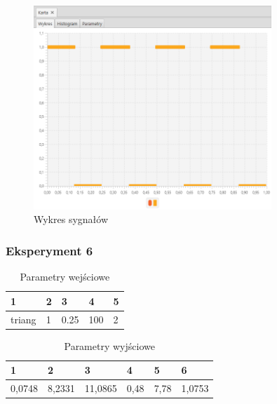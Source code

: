 \documentclass[12pt]{article}
\begin{document}
{{{                \begin{figure}[H]
                    \centering
                    \includegraphics[width=0.8\textwidth]{img/result/experiment5/05/data_draw_sampling_output_quant_output_204002.png}
                    \caption{Wykres sygnałów}
                \end{figure}
            }
            \newpage

            \subsubsection{Eksperyment 6} {
                \begin{table}[H]
                    \centering
                    \begin{tabular}{|l|l|l|l|l|}
                        \hline
                        1 & 2 & 3 & 4 & 5   \\ \hline
                        triang & 1 & 0.25 & 100 & 2   \\ \hline
                    \end{tabular}
                    \caption{Parametry wejściowe}
                \end{table}

                \begin{table}[H]
                    \centering
                    \begin{tabular}{|l|l|l|l|l|l|}
                        \hline
                        1 & 2 & 3 & 4 & 5 & 6  \\ \hline
                        0,0748 & 8,2331 & 11,0865 & 0,48 & 7,78 & 1,0753 \\ \hline
                    \end{tabular}
                    \caption{Parametry wyjściowe}
                \end{table}


}}}
\end{document}

